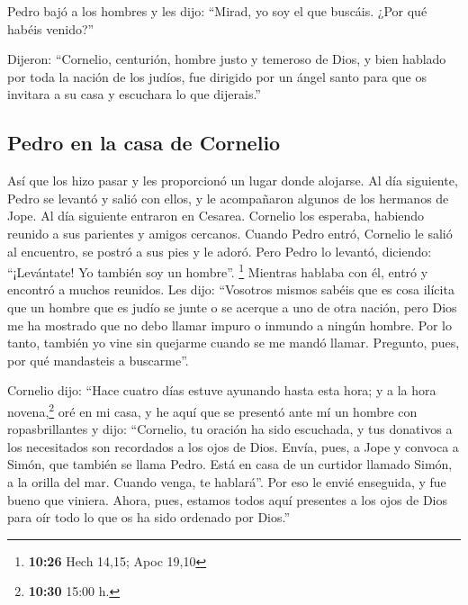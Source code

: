  Pedro bajó a los hombres y les dijo: ``Mirad, yo soy el
que buscáis. ¿Por qué habéis venido?''

 Dijeron: ``Cornelio, centurión, hombre justo y temeroso
de Dios, y bien hablado por toda la nación de los judíos, fue dirigido
por un ángel santo para que os invitara a su casa y escuchara lo que
dijerais.''

\hypertarget{pedro-en-la-casa-de-cornelio}{%
\subsection{Pedro en la casa de
Cornelio}\label{pedro-en-la-casa-de-cornelio}}

 Así que los hizo pasar y les proporcionó un lugar donde
alojarse. Al día siguiente, Pedro se levantó y salió con ellos, y le
acompañaron algunos de los hermanos de Jope.  Al día
siguiente entraron en Cesarea. Cornelio los esperaba, habiendo reunido a
sus parientes y amigos cercanos.  Cuando Pedro entró,
Cornelio le salió al encuentro, se postró a sus pies y le adoró.
 Pero Pedro lo levantó, diciendo: ``¡Levántate! Yo
también soy un hombre''. \footnote{\textbf{10:26} Hech 14,15; Apoc 19,10}
 Mientras hablaba con él, entró y encontró a muchos
reunidos.  Les dijo: ``Vosotros mismos sabéis que es cosa
ilícita que un hombre que es judío se junte o se acerque a uno de otra
nación, pero Dios me ha mostrado que no debo llamar impuro o inmundo a
ningún hombre.  Por lo tanto, también yo vine sin
quejarme cuando se me mandó llamar. Pregunto, pues, por qué mandasteis a
buscarme''.

 Cornelio dijo: ``Hace cuatro días estuve ayunando hasta
esta hora; y a la hora novena,\footnote{\textbf{10:30} 15:00 h.} oré en
mi casa, y he aquí que se presentó ante mí un hombre con ropasbrillantes
 y dijo: ``Cornelio, tu oración ha sido escuchada, y tus
donativos a los necesitados son recordados a los ojos de Dios.
 Envía, pues, a Jope y convoca a Simón, que también se
llama Pedro. Está en casa de un curtidor llamado Simón, a la orilla del
mar. Cuando venga, te hablará''.  Por eso le envié
enseguida, y fue bueno que viniera. Ahora, pues, estamos todos aquí
presentes a los ojos de Dios para oír todo lo que os ha sido ordenado
por Dios.''

